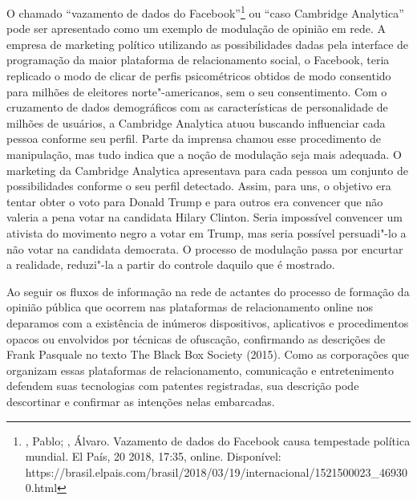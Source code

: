 O chamado ``vazamento de dados do Facebook''\footnote{, Pablo;
  , Álvaro. Vazamento de dados do Facebook causa tempestade
  política mundial. El País, 20  2018, 17:35, online. Disponível:
  https://brasil.elpais.com/brasil/2018/03/19/internacional/1521500023\_469300.html}
ou ``caso Cambridge Analytica'' pode ser apresentado como um exemplo de
modulação de opinião em rede. A empresa de marketing político utilizando
as possibilidades dadas pela interface de programação da maior
plataforma de relacionamento social, o Facebook, teria replicado o modo
de clicar de perfis psicométricos obtidos de modo consentido para
milhões de eleitores norte"-americanos, sem o seu consentimento. Com o
cruzamento de dados demográficos com as características de personalidade
de milhões de usuários, a Cambridge Analytica atuou buscando influenciar
cada pessoa conforme seu perfil. Parte da imprensa chamou esse
procedimento de manipulação, mas tudo indica que a noção de modulação
seja mais adequada. O marketing da Cambridge Analytica apresentava para
cada pessoa um conjunto de possibilidades conforme o seu perfil
detectado. Assim, para uns, o objetivo era tentar obter o voto para
Donald Trump e para outros era convencer que não valeria a pena votar na
candidata Hilary Clinton. Seria impossível convencer um ativista do
movimento negro a votar em Trump, mas seria possível persuadi"-lo a não
votar na candidata democrata. O processo de modulação passa por encurtar
a realidade, reduzi"-la a partir do controle daquilo que é mostrado.

Ao seguir os fluxos de informação na rede de actantes do processo de
formação da opinião pública que ocorrem nas plataformas de
relacionamento online nos deparamos com a existência de inúmeros
dispositivos, aplicativos e procedimentos opacos ou envolvidos por
técnicas de ofuscação, confirmando as descrições de Frank Pasquale no
texto The Black Box Society (2015). Como as corporações que organizam
essas plataformas de relacionamento, comunicação e entretenimento
defendem suas tecnologias com patentes registradas, sua descrição pode
descortinar e confirmar as intenções nelas embarcadas.

